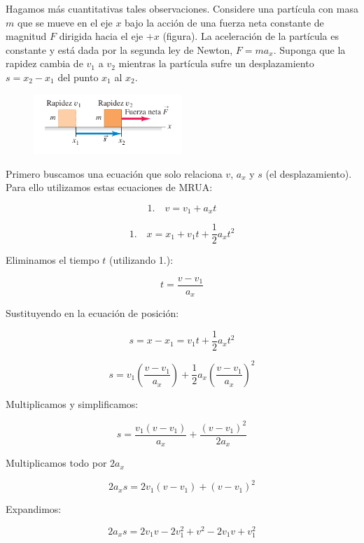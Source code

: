 \documentclass{article}
\begin{document}
    \par Hagamos más cuantitativas tales observaciones. Considere una partícula con masa $m$ que se mueve en el eje $x$ bajo la acción de una fuerza neta constante de magnitud $F$ dirigida hacia el eje $+x$ (figura). La aceleración de la partícula es constante y está dada por la segunda ley de Newton, $F = m a_x$. Suponga que la rapidez cambia de $v_1$ a $v_2$ mientras la partícula sufre un desplazamiento $s = x_2 - x_1$ del punto $x_1$ al $x_2$.

    \begin{figure}[H]
        \centering
        \includegraphics[width=0.5\textwidth]{img/5.2-2.png}
    \end{figure}

    \par Primero buscamos una ecuación que solo relaciona $v$, $a_x$ y $s$ (el desplazamiento). Para ello utilizamos estas ecuaciones de MRUA:

    \[\text{1.}\quad v = v_1 + a_xt\]

    \[\text{1.}\quad x = x_1 + v_1t + \frac{1}{2}a_xt^2\]

    \par Eliminamos el tiempo $t$ (utilizando 1.):

    \[t = \frac{v-v_1}{a_x}\]

    \par Sustituyendo en la ecuación de posición:

    \[s = x - x_1 = v_1 t + \frac{1}{2} a_x t^2\]

    \[s = v_1 \left(\frac{v-v_1}{a_x}\right)  + \frac{1}{2} a_x \left(\frac{v-v_1}{a_x}\right) ^2\]

    \par Multiplicamos y simplificamos:

    \[s = \frac{v_1 (v - v_1)}{a_x} + \frac{(v-v_1)^2}{2 a_x}\]

    \par Multiplicamos todo por $2a_x$

    \[ 2a_x s = 2 v_1 (v - v_1) + (v - v_1)^2 \]

    \par Expandimos:

    \[ 2a_x s = 2 v_1 v - 2 v_1^2 + v^2 - 2 v_1 v + v_1^2\]
\end{document}
